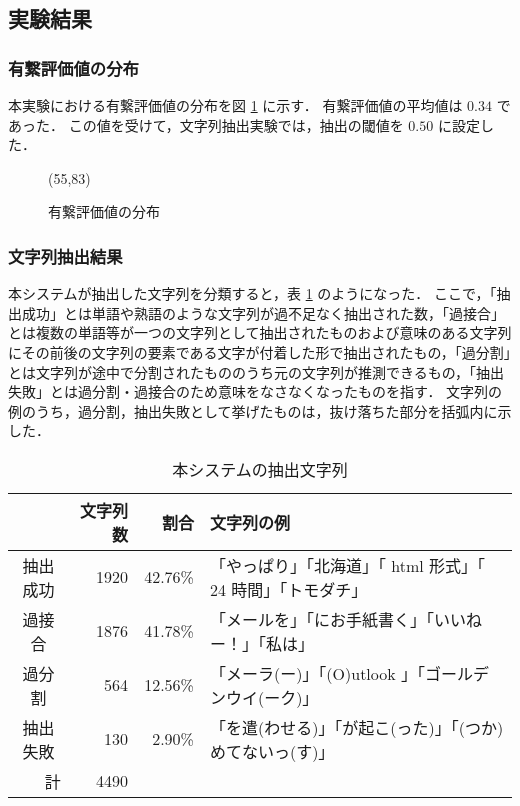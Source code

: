\subsection{実験結果}
\subsubsection{有繋評価値の分布}
本実験における有繋評価値の分布を図 \ref{fig:scoredistribution} に示す．
有繋評価値の平均値は $0.34$ であった．
この値を受けて，文字列抽出実験では，抽出の閾値を $0.50$ に設定した．
\begin{figure}[htb]
\begin{minipage}{\textwidth}
\begin{center}

\atari(55,83)

\caption{有繋評価値の分布}
\label{fig:scoredistribution}
\end{center}
\end{minipage}
\end{figure}
\subsubsection{文字列抽出結果}

本システムが抽出した文字列を分類すると，表 \ref{tab:over05seq} のようになった．
ここで，「抽出成功」とは単語や熟語のような文字列が過不足なく抽出された数，「過接合」とは複数の単語等が一つの文字列として抽出されたものおよび意味のある文字列にその前後の文字列の要素である文字が付着した形で抽出されたもの，「過分割」とは文字列が途中で分割されたもののうち元の文字列が推測できるもの，「抽出失敗」とは過分割・過接合のため意味をなさなくなったものを指す．
文字列の例のうち，過分割，抽出失敗として挙げたものは，抜け落ちた部分を括弧内に示した．
\begin{table}[hbt]
\begin{minipage}{\textwidth}
\begin{center}
\caption{本システムの抽出文字列}
\label{tab:over05seq}
\begin{tabular}{crrl}
\hline
\hline
         & 文字列数 & 割合 & 文字列の例\\
\hline
抽出成功 & 1920 & 42.76\% & 「やっぱり」「北海道」「 html 形式」「 24 時間」「トモダチ」\\
過接合   & 1876 & 41.78\% & 「メールを」「にお手紙書く」「いいねー！」「私は」\\
過分割   &  564 & 12.56\% & 「メーラ(ー)」「(O)utlook 」「ゴールデンウイ(ーク)」\\
抽出失敗 &  130 &  2.90\% & 「を遣(わせる)」「が起こ(った)」「(つか)めてないっ(す)」\\
\hline
\multicolumn{1}{r}{計} & 4490 &  & \\
\hline
\hline
\end{tabular}
\end{center}
\end{minipage}
\end{table}

